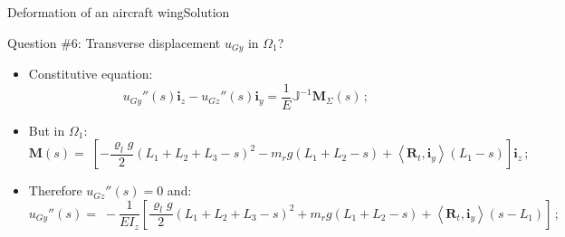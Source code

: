 \documentclass{beamer}
\newcommand{\uj}{u}
\newcommand{\yj}{y}
\newcommand{\zj}{z}
\renewcommand{\ij}{i}
\newcommand{\iv}{{\boldsymbol\ij}}
\newcommand{\medium}{\Omega}
\newcommand*{\Mstaticj}{J}
\newcommand*{\Mstatic}{{\mathbb\Mstaticj}}
\newcommand{\roi}{\varrho}
\newcommand{\Fresj}{R}
\newcommand{\Mresj}{M}
\newcommand{\Fres}{{\boldsymbol\Fresj}}
\newcommand{\Mres}{{\boldsymbol\Mresj}}
\newcommand{\scal}[1]{\left\langle{#1}\right\rangle}
\begin{document}
\begin{frame}{Deformation of an aircraft wing}{Solution}
\begin{overprint}
\vskip-20pt
\begin{exampleblock}{Question \#6: Transverse displacement $\uj_{G\yj}$ in $\medium_1$?}
\begin{itemize}
\item Constitutive equation:
\begin{displaymath}
\uj_{G\yj}''(s)\iv_\zj-\uj_{G\zj}''(s)\iv_\yj=\frac{1}{E}\Mstatic^{-1}\Mres_\Sigma(s)\,;
\end{displaymath}
\item But in $\medium_1$:
\begin{displaymath}
\!\!\!\!\Mres(s) = \scriptstyle\; \left[-\frac{\roi_l g}{2}(L_1+L_2+L_3-s)^2 - m_r g(L_1+L_2-s) + \scal{\Fres_t,\iv_\yj}(L_1-s)\right] \iv_\zj\,;
\end{displaymath}
\item Therefore $\uj_{G\zj}''(s)=0$ and:
\begin{displaymath}
\!\!\!\!\!\!\!\!\uj_{G\yj}''(s) = \scriptstyle\; -\frac{1}{EI_\zj}\left[\frac{\roi_l g}{2}(L_1+L_2+L_3-s)^2 +m_r g(L_1+L_2-s) + \scal{\Fres_t,\iv_\yj}(s-L_1)\right]\,;
\end{displaymath}
\end{itemize}
\end{exampleblock}


\end{overprint}
\end{frame}
\end{document}
